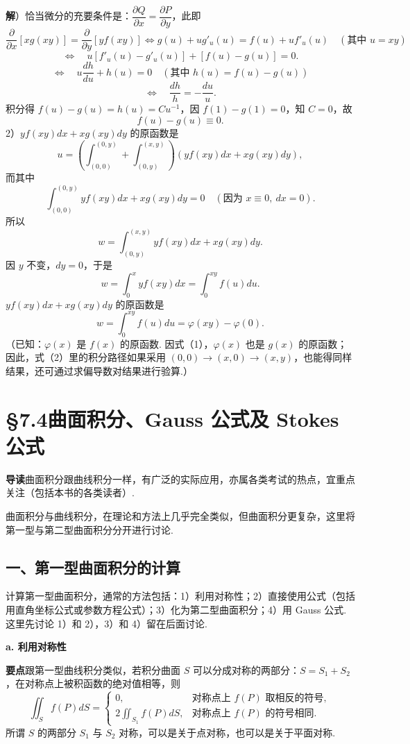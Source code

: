 \documentclass[UTF8, 12pt, fontset=fandol, oneside]{ctexart}
\begin{document}
\noindent\textbf{解}）恰当微分的充要条件是：$\dfrac{\partial Q}{\partial x}=\dfrac{\partial P}{\partial y}$，此即
\[
\frac{\partial}{\partial x}[xg(xy)]
=\frac{\partial}{\partial y}[yf(xy)]
\Longleftrightarrow
g(u)+ug'_u(u)=f(u)+uf'_u(u)\quad(\text{其中 }u=xy)
\]
\[
\Longleftrightarrow\quad
u[f'_u(u)-g'_u(u)]+[f(u)-g(u)]=0.
\]
\[
\Longleftrightarrow\quad
u\frac{dh}{du}+h(u)=0\quad(\text{其中 }h(u)=f(u)-g(u))
\]
\[
\Longleftrightarrow\quad
\frac{dh}{h}=-\frac{du}{u}.
\]
积分得 $f(u)-g(u)=h(u)=Cu^{-1}$，因 $f(1)-g(1)=0$，知 $C=0$，故
\[
f(u)-g(u)\equiv0.
\tag{1}
\]
2）$yf(xy)dx+xg(xy)dy$ 的原函数是
\[
u=\left(\int_{(0,0)}^{(0,y)}+\int_{(0,y)}^{(x,y)}\right)
(yf(xy)dx+xg(xy)dy),
\tag{2}
\]
而其中
\[
\int_{(0,0)}^{(0,y)}yf(xy)dx+xg(xy)dy=0\quad(\text{因为 }x\equiv0,\ dx=0).
\]
所以
\[
w=\int_{(0,y)}^{(x,y)}yf(xy)dx+xg(xy)dy.
\]
因 $y$ 不变，$dy=0$，于是
\[
w=\int_0^xyf(xy)dx=\int_0^{xy}f(u)du.
\]
$yf(xy)dx+xg(xy)dy$ 的原函数是
\[
w=\int_0^{xy}f(u)du=\varphi(xy)-\varphi(0).
\]
（已知：$\varphi(x)$ 是 $f(x)$ 的原函数. 因式（1），$\varphi(x)$ 也是 $g(x)$ 的原函数；因此，式（2）里的积分路径如果采用 $(0,0)\to(x,0)\to(x,y)$，也能得同样结果，还可通过求偏导数对结果进行验算.）

\section*{§7.4\quad 曲面积分、Gauss 公式及 Stokes 公式}

\noindent\textbf{导读}\quad 曲面积分跟曲线积分一样，有广泛的实际应用，亦属各类考试的热点，宜重点关注（包括本书的各类读者）.

曲面积分与曲线积分，在理论和方法上几乎完全类似，但曲面积分更复杂，这里将第一型与第二型曲面积分分开进行讨论.

\subsection*{一、第一型曲面积分的计算}

计算第一型曲面积分，通常的方法包括：1）利用对称性；2）直接使用公式（包括用直角坐标公式或参数方程公式）；3）化为第二型曲面积分；4）用 Gauss 公式. 这里先讨论 1）和 2），3）和 4）留在后面讨论.

\noindent\textbf{a. 利用对称性}

\noindent\textbf{要点}\quad 跟第一型曲线积分类似，若积分曲面 $S$ 可以分成对称的两部分：$S=S_1+S_2$，在对称点上被积函数的绝对值相等，则
\[
\iint_Sf(P)dS=
\begin{cases}
0, & \text{对称点上 }f(P)\text{ 取相反的符号},\\
2\iint_{S_1}f(P)dS, & \text{对称点上 }f(P)\text{ 的符号相同}.
\end{cases}
\]
所谓 $S$ 的两部分 $S_1$ 与 $S_2$ 对称，可以是关于点对称，也可以是关于平面对称.
\end{document}
